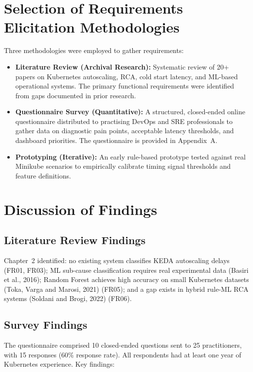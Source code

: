 \section{Selection of Requirements Elicitation Methodologies}
Three methodologies were employed to gather requirements:

\begin{itemize}
    \item \textbf{Literature Review (Archival Research):} Systematic review of 20+ papers on Kubernetes autoscaling, RCA, cold start latency, and ML-based operational systems. The primary functional requirements were identified from gaps documented in prior research.
    \item \textbf{Questionnaire Survey (Quantitative):} A structured, closed-ended online questionnaire distributed to practising DevOps and SRE professionals to gather data on diagnostic pain points, acceptable latency thresholds, and dashboard priorities. The questionnaire is provided in Appendix~A.
    \item \textbf{Prototyping (Iterative):} An early rule-based prototype tested against real Minikube scenarios to empirically calibrate timing signal thresholds and feature definitions.
\end{itemize}

\section{Discussion of Findings}

\subsection{Literature Review Findings}
Chapter~2 identified: no existing system classifies KEDA autoscaling delays (FR01, FR03); ML sub-cause classification requires real experimental data (Basiri et al., 2016); Random Forest achieves high accuracy on small Kubernetes datasets (Toka, Varga and Marosi, 2021) (FR05); and a gap exists in hybrid rule-ML RCA systems (Soldani and Brogi, 2022) (FR06).

\subsection{Survey Findings}
The questionnaire comprised 10 closed-ended questions sent to 25 practitioners, with 15 responses (60\% response rate). All respondents had at least one year of Kubernetes experience. Key findings:

